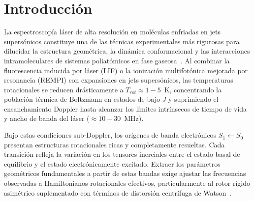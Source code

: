 \documentclass[aps,jcp,reprint,twocolumn,superscriptaddress,showpacs,amsmath,amssymb]{revtex4-2}
\begin{document}
\maketitle

\section{Introducci\'on}
La espectroscop\'ia l\'aser de alta resoluci\'on en mol\'eculas enfriadas en jets supers\'onicos constituye una de las t\'ecnicas experimentales m\'as rigurosas para dilucidar la estructura geom\'etrica, la din\'amica conformacional y las interacciones intramoleculares de sistemas poliat\'omicos en fase gaseosa~\cite{alvarez2006rotationally,tan2019high}. Al combinar la fluorescencia inducida por l\'aser (LIF) o la ionizaci\'on multifot\'onica mejorada por resonancia (REMPI) con expansiones en jets supers\'onicos, las temperaturas rotacionales se reducen dr\'asticamente a $T_{rot} \approx 1 - 5$~K, concentrando la poblaci\'on t\'ermica de Boltzmann en estados de bajo $J$ y suprimiendo el ensanchamiento Doppler hasta alcanzar los l\'imites intr\'insecos de tiempo de vida y ancho de banda del l\'aser ($\approx 10 - 30$~MHz).

Bajo estas condiciones sub-Doppler, los or\'igenes de banda electr\'onicos $S_1 \leftarrow S_0$ presentan estructuras rotacionales ricas y completamente resueltas. Cada transici\'on refleja la variaci\'on en los tensores inerciales entre el estado basal de equilibrio y el estado electr\'onicamente excitado. Extraer los par\'ametros geom\'etricos fundamentales a partir de estas bandas exige ajustar las frecuencias observadas a Hamiltonianos rotacionales efectivos, particularmente al rotor r\'igido asim\'etrico suplementado con t\'erminos de distorsi\'on centr\'ifuga de Watson~\cite{watson1977aspects}.
\end{document}

